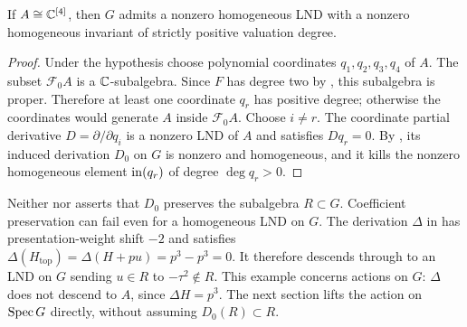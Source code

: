\begin{proposition}\label{prop:positive-invariant}
If $A\cong\mathbb C^{[4]}$, then $G$ admits a nonzero homogeneous LND
with a nonzero homogeneous invariant of strictly positive valuation
degree.
\end{proposition}

\begin{proof}
Under the hypothesis choose polynomial coordinates
$q_1,q_2,q_3,q_4$ of $A$.
The subset $\mathcal F_0A$ is a $\mathbb C$-subalgebra.  Since $F$ has
degree two by , this subalgebra is
proper.  Therefore at least one coordinate $q_r$ has positive
degree; otherwise the coordinates would generate $A$ inside
$\mathcal F_0A$.
Choose $i\ne r$.  The coordinate partial derivative
$D=\partial/\partial q_i$ is a nonzero LND of $A$ and satisfies
$Dq_r=0$.  By , its induced derivation $D_0$
on $G$ is nonzero and homogeneous, and it kills the nonzero
homogeneous element $\operatorname{in}(q_r)$ of degree $\deg q_r>0$.
\end{proof}

Neither  nor 
asserts that $D_0$ preserves the subalgebra $R\subset G$.
Coefficient preservation can fail even for a homogeneous LND on $G$.
The derivation $\Delta$ in  has presentation-weight
shift $-2$ and satisfies
$\Delta(H_{\mathrm{top}})=\Delta(H+pu)=p^3-p^3=0$.
It therefore descends through  to an LND
on $G$ sending $u\in R$ to $-\tau^2\notin R$.
This example concerns actions on $G$: $\Delta$ does not descend to
$A$, since $\Delta H=p^3$.
The next section lifts the action on $\operatorname{Spec} G$ directly, without
assuming $D_0(R)\subset R$.
